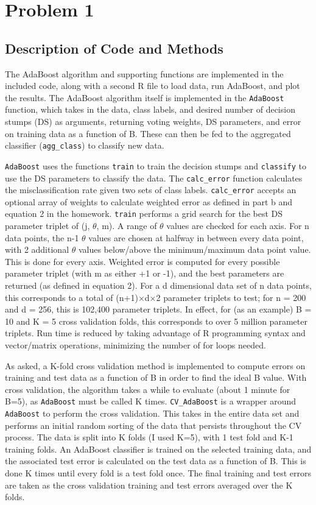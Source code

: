 \documentclass[12pt]{article}%
\begin{document}
\section{Problem 1}
\subsection{Description of Code and Methods}
The AdaBoost algorithm and supporting functions are implemented in the included code, along with a second R file to load data, run AdaBoost, and plot the results. The AdaBoost algorithm itself is implemented in the \texttt{AdaBoost} function, which takes in the data, class labels, and desired number of decision stumps (DS) as arguments, returning voting weights, DS parameters, and error on training data as a function of B. These can then be fed to the aggregated classifier (\texttt{agg\_class}) to classify new data. 

\texttt{AdaBoost} uses the functions \texttt{train} to train the decision stumps and \texttt{classify} to use the DS parameters to classify the data. The \texttt{calc\_error} function calculates the misclassification rate given two sets of class labels. \texttt{calc\_error} accepts an optional array of weights to calculate weighted error as defined in part b and equation 2 in the homework. \texttt{train} performs a grid search for the best DS parameter triplet of (j, $\theta$, m). A range of $\theta$ values are checked for each axis. For n data points, the n-1 $\theta$ values are chosen at halfway in between every data point, with 2 additional $\theta$ values below/above the minimum/maximum data point value. This is done for every axis. Weighted error is computed for every possible parameter triplet (with m as either +1 or -1), and the best parameters are returned (as defined in equation 2). For a d dimensional data set of n data points, this corresponds to a total of (n+1)$\times$d$\times$2 parameter triplets to test; for n = 200 and d = 256, this is 102,400 parameter triplets. In effect, for (as an example) B = 10 and K = 5 cross validation folds, this corresponds to over 5 million parameter triplets. Run time is reduced by taking advantage of R programming syntax and vector/matrix operations, minimizing the number of for loops needed.

As asked, a K-fold cross validation method is implemented to compute errors on training and test data as a function of B in order to find the ideal B value. With cross validation, the algorithm takes a while to evaluate (about 1 minute for B=5), as \texttt{AdaBoost} must be called K times. \texttt{CV\_AdaBoost} is a wrapper around \texttt{AdaBoost} to perform the cross validation. This takes in the entire data set and performs an initial random sorting of the data that persists throughout the CV process. The data is split into K folds (I used K=5), with 1 test fold and K-1 training folds. An AdaBoost classifier is trained on the selected training data, and the associated test error is calculated on the test data as a function of B. This is done K times until every fold is a test fold once. The final training and test errors are taken as the cross validation training and test errors averaged over the K folds.
\end{document}

